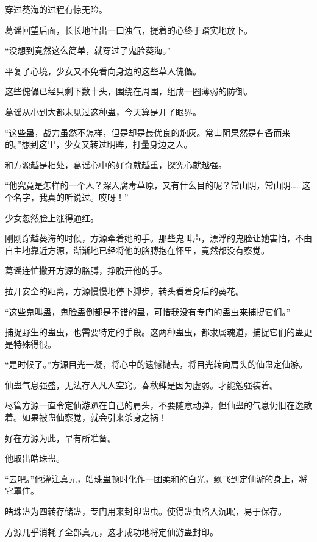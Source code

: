 
\begin{this_body}

穿过葵海的过程有惊无险。

葛谣回望后面，长长地吐出一口浊气，提着的心终于踏实地放下。

“没想到竟然这么简单，就穿过了鬼脸葵海。”

平复了心境，少女又不免看向身边的这些草人傀儡。

这些傀儡已经只剩下数十头，围绕在周围，组成一圈薄弱的防御。

葛谣从小到大都未见过这种蛊，今天算是开了眼界。

“这些蛊，战力虽然不怎样，但是却是最优良的炮灰。常山阴果然是有备而来的。”想到这里，少女又转过明眸，打量身边之人。

和方源越是相处，葛谣心中的好奇就越重，探究心就越强。

“他究竟是怎样的一个人？深入腐毒草原，又有什么目的呢？常山阴，常山阴……这个名字，我真的听说过。哎呀！”

少女忽然脸上涨得通红。

刚刚穿越葵海的时候，方源牵着她的手。那些鬼叫声，漂浮的鬼脸让她害怕，不由自主地靠近方源，渐渐地已经将他的胳膊抱在怀里，竟然都没有察觉。

葛谣连忙撒开方源的胳膊，挣脱开他的手。

拉开安全的距离，方源慢慢地停下脚步，转头看着身后的葵花。

“这些鬼叫蛊，鬼脸蛊倒都是不错的蛊，可惜我没有专门的蛊虫来捕捉它们。”

捕捉野生的蛊虫，也需要特定的手段。这两种蛊虫，都隶属魂道，捕捉它们的蛊更是特殊得很。

“是时候了。”方源目光一凝，将心中的遗憾抛去，将目光转向肩头的仙蛊定仙游。

仙蛊气息强盛，无法存入凡人空窍。春秋蝉是因为虚弱。才能勉强装着。

尽管方源一直令定仙游趴在自己的肩头，不要随意动弹，但仙蛊的气息仍旧在逸散着。如果被蛊仙察觉，就会引来杀身之祸！

好在方源为此，早有所准备。

他取出皓珠蛊。

“去吧。”他灌注真元，皓珠蛊顿时化作一团柔和的白光，飘飞到定仙游的身上，将它罩住。

皓珠蛊为四转存储蛊，专门用来封印蛊虫。使得蛊虫陷入沉眠，易于保存。

方源几乎消耗了全部真元，这才成功地将定仙游蛊封印。


\end{this_body}
